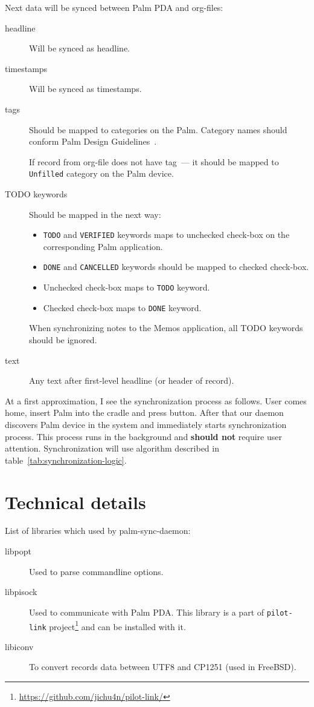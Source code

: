 \documentclass[a4paper,12pt,oneside]{scrartcl}
\begin{document}
Next data will be synced between Palm PDA and org-files:

\begin{description}
\item[headline] Will be synced as headline.
\item[timestamps] Will be synced as timestamps.
\item[tags] Should be mapped to categories on the Palm. Category names should
  conform Palm Design Guidelines~\cite{PalmDesignGuide}.

  If record from org-file does not have tag~--- it should be mapped to
  \texttt{Unfilled} category on the Palm device.
\item[TODO keywords] Should be mapped in the next way:
  \begin{itemize}
  \item \texttt{TODO} and \texttt{VERIFIED} keywords maps to unchecked check-box
    on the corresponding Palm application.
  \item \texttt{DONE} and \texttt{CANCELLED} keywords should be mapped to
    checked check-box.
  \item Unchecked check-box maps to \texttt{TODO} keyword.
  \item Checked check-box maps to \texttt{DONE} keyword.
  \end{itemize}

  When synchronizing notes to the Memos application, all TODO keywords should be
  ignored.
\item[text] Any text after first-level headline (or header of record).
\end{description}

At a first approximation, I see the synchronization process as follows. User
comes home, insert Palm into the cradle and press button. After that our daemon
discovers Palm device in the system and immediately starts synchronization
process. This process runs in the background and \textbf{should not} require
user attention. Synchronization will use algorithm described in
table~\ref{tab:synchronization-logic}.

\section{Technical details}
\label{sec:technical-details}

List of libraries which used by palm-sync-daemon:

\begin{description}
\item[libpopt] Used to parse commandline options.
\item[libpisock] Used to communicate with Palm PDA. This library is a part of
  \texttt{pilot-link}
  project\footnote{\url{https://github.com/jichu4n/pilot-link/}} and can be
  installed with it.
\item[libiconv] To convert records data between UTF8 and CP1251 (used in
  FreeBSD).
\end{description}
\end{document}

